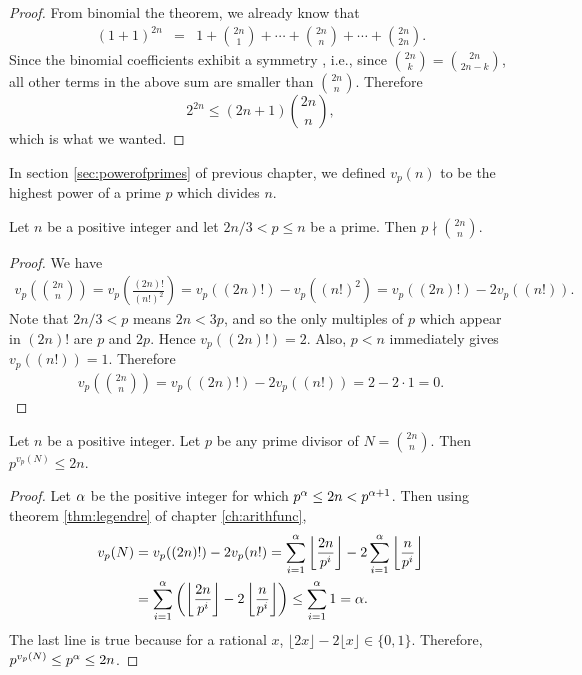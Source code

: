 \documentclass{subfile}
\begin{document}
	\begin{proof}
		From binomial the theorem, we already know that 
		\begin{eqnarray*}
			(1+1)^{2n}  & = & 1+\binom{2n}1+\cdots+\binom{2n}{n}+\cdots+\binom{2n}{2n}.
		\end{eqnarray*}
		Since the binomial coefficients exhibit a symmetry , i.e., since $\binom{2n}{k}=\binom{2n}{2n-k}$, all other terms in the above sum are smaller than $\binom{2n}{n}$. Therefore
		\[2^{2n}\leq(2n+1)\binom{2n}n,\]
		which is what we wanted.
		
	\end{proof}
	In section \eqref{sec:powerofprimes} of previous chapter, we defined $v_p(n)$ to be the highest power of a prime $p$ which divides $n$. 
	\begin{lemma}\label{lem:bertrand2}
		Let $n$ be a positive integer and let $2n/3<p\leq n$ be a prime. Then $p \nmid \binom{2n}n$.
	\end{lemma}
	
	\begin{proof}
		We have
		\begin{align*}
			v_p \left(\binom{2n}n\right) =v_p \left(\frac{(2n)!}{(n!)^2}\right) = v_p((2n)!) - v_p((n!)^2) = v_p((2n)!) - 2v_p((n!)).
		\end{align*}
		Note that $2n/3<p$ means $2n<3p$, and so the only multiples of $p$ which appear in $(2n)!$ are $p$ and $2p$. Hence $v_p((2n)!) = 2$. Also, $p<n$ immediately gives $v_p((n!))=1$. Therefore
		\begin{align*}
			v_p \left(\binom{2n}n\right) = v_p((2n)!) - 2v_p((n!)) =  2 - 2 \cdot 1 = 0.
		\end{align*}
	\end{proof}
	
	\begin{lemma}\label{lem:bertrand3}
		Let $n$ be a positive integer. Let $p$ be any prime divisor of $N=\binom{2n}n$. Then $p^{v_p(N)}\leq2n$.
	\end{lemma}
	
	\begin{proof}
		Let $\alpha$ be the positive integer for which $p^\alpha \leq 2n<p^{\alpha +1}$. Then using theorem \eqref{thm:legendre} of chapter \eqref{ch:arithfunc},
		\begin{align*}
			v_p(N) & =  v_p((2n)!)-2v_p(n!)= \sum_{i=1}^{\alpha }\left\lfloor\dfrac{2n}{p^i}\right\rfloor-2\sum_{i=1}^{\alpha }\left\lfloor\dfrac{n}{p^i}\right\rfloor\\
			& =  \sum_{i=1}^{\alpha }\left(\left\lfloor\dfrac{2n}{p^i}\right\rfloor-2\left\lfloor\dfrac{n}{p^i}\right\rfloor\right) \leq \sum_{i=1}^{\alpha }1 =\alpha.
		\end{align*}
		The last line is true because for a rational $x$, $\lfloor2x\rfloor-2\lfloor x\rfloor\in\{0,1\}$. Therefore, $p^{v_p(N)} \leq p^{\alpha} \leq 2n$.
	\end{proof}
	
\end{document}
